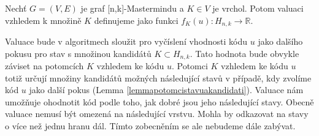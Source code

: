 







\begin{definice}[Valuace]
    Nechť $G = (V,E)$ je graf [n,k]-Mastermindu a $K \in V$ je vrchol. Potom valuaci vzhledem k množině $K$ definujeme jako funkci $f_K(u) \colon H_{n,k} \to \mathbb{R}$.
\end{definice}


Valuace bude v algoritmech sloužit pro vyčíslení vhodnosti kódu $u$ jako dalšího pokusu pro stav s množinou kandidátů $K\subset H_{n,k}$. Tato hodnota bude obvykle záviset na potomcích $K$ vzhledem ke kódu $u$. Potomci $K$ vzhledem ke kódu $u$ totiž určují množiny kandidátů možných následující stavů v případě, kdy zvolíme kód $u$ jako další pokus (Lemma \ref{lemmapotomcistavuakandidati}). Valuace nám umožňuje ohodnotit kód podle toho, jak dobré jsou jeho následující stavy. Obecně valuace nemusí být omezená na následující vrstvu. Mohla by odkazovat na stavy o více než jednu hranu dál. Tímto zobecněním se ale nebudeme dále zabývat.

